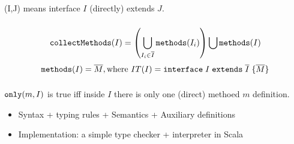 \subsubsection{\ext}
\ext(I,J) means interface $I$ (directly) extends $J$.



\subsubsection{\collectMethods}
\[ \texttt{collectMethods}(I) = \left( \bigcup_{I_i \in \overline{I}} \texttt{methods}(I_i) \right) \bigcup \texttt{methods}(I) \]
\[ \texttt{methods}(I) = \overline{M}, \text{where } IT(I) = \texttt{interface} \; I \; \texttt{extends} \; \overline{I} \; {\{} \overline{M} {\}} \]



\subsubsection{\needed}

\subsubsection{\only}
$\texttt{only}(m, I)$ is true iff inside $I$ there is only one (direct) methoed $m$ definition.


\begin{itemize}
	\item Syntax + typing rules + Semantics + Auxiliary definitions
	\item Implementation: a simple type checker + interpreter in Scala
\end{itemize}


